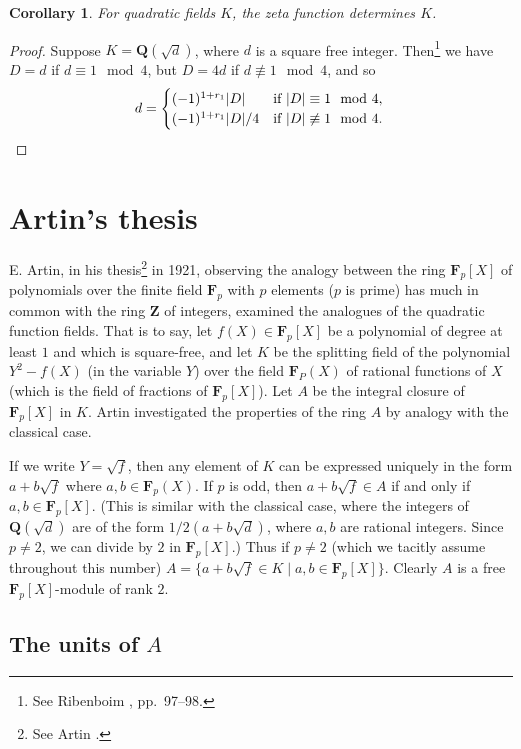 \documentclass[10pt]{article}
\newtheorem{coro}[theo]{Corollary}
\theoremstyle{definition}
\def\ZZ{\mathbf{Z}}
\def\QQ{\mathbf{Q}}
\def\FF{\mathbf{F}}
\def\fntwze{See Ribenboim \cite{bib:154}, pp.~97--98.}
\def\fntwon{See Artin \cite{bib:6}.}
\begin{document}
\begin{coro}
\label{2.4.4}
For quadratic fields $K$, the zeta function determines $K$.
\end{coro}

\begin{proof}
Suppose $K = \QQ(\sqrt d)$, where $d$ is a square free integer.
Then\footnote{\fntwze} we have $D = d$ if $d \equiv 1 \mod 4$, but $D = 4d$ if $d \not\equiv 1 \mod 4$, and so
\[
d = \begin{cases}
(-1)^{1+r_1} |D| & \text{if $|D| \equiv 1 \mod 4$},
\\
(-1)^{1+r_1} |D|/4 & \text{if $|D| \not\equiv 1 \mod 4$}.
\end{cases}
\qedhere
\]
\end{proof}





\section{Artin's thesis}
\label{ch:3}

E. Artin, in his thesis\footnote{\fntwon} in 1921, observing the analogy between the ring $\FF_p[X]$ of polynomials over the finite field $\FF_p$ with $p$ elements ($p$ is prime) has much in common with the ring $\ZZ$ of integers, examined the analogues of the quadratic function fields.
That is to say, let $f(X) \in \FF_p[X]$ be a polynomial of degree at least $1$ and which is square-free, and let $K$ be the splitting field of the polynomial $Y^2 - f(X)$ (in the variable $Y$) over the field $\FF_P(X)$ of rational functions of $X$ (which is the field of fractions of $\FF_p[X]$).
Let $A$ be the integral closure of $\FF_p[X]$ in $K$.
Artin investigated the properties of the ring $A$ by analogy with the classical case.

If we write $Y = \sqrt f$, then any element of $K$ can be expressed uniquely in the form $a + b \sqrt f$ where $a,b \in \FF_p(X)$.
If $p$ is odd, then $a + b \sqrt f \in A$ if and only if $a,b \in \FF_p[X]$.
(This is similar with the classical case, where the integers of $\QQ(\sqrt d)$ are of the form $1/2(a + b\sqrt d)$, where $a,b$ are rational integers.
Since $p\not=2$, we can divide by $2$ in $\FF_p[X]$.)
Thus if $p \not= 2$ (which we tacitly assume throughout this number) $A = \{a + b \sqrt f \in K \mid a, b \in \FF_p[X]\}$.
Clearly $A$ is a free $\FF_p[X]$-module of rank $2$.


\subsection[The units of A]{The units of $A$}
\label{ch:3.1}
\end{document}
